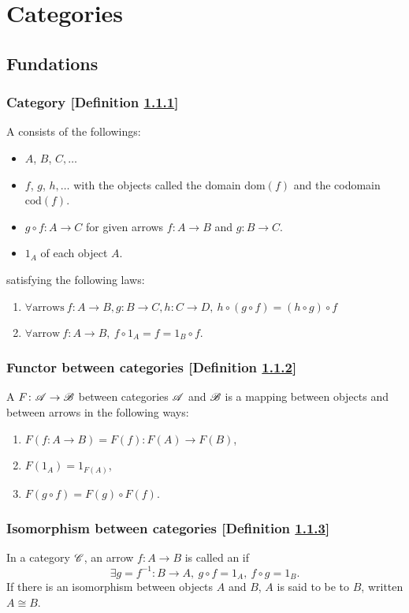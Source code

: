 \newcommand{\sets}{\mathbf{Sets}}
\section{Categories\cite{awodey}}
\subsection{Fundations}
\subsubsection{Category [Definition \ref{category}]}\label{category}
A  consists of the followings:
\begin{itemize}
\item {} $A$, $B$, $C, \dotsc$
\item {} $f$, $g$, $h, \dotsc$ with the objects called the domain $\mathrm{dom}(f)$ and the codomain $\mathrm{cod}(f)$.
\item {} $g \circ f \colon A \to C$ for given arrows $f \colon A \to B$ and $g \colon B \to C$.
\item {} $1_A$ of each object $A$.
\end{itemize}
satisfying the following laws:
\begin{enumerate}
\item $\forall \text{arrows}\ f \colon A \to B, g \colon B \to C, h \colon C \to D,\ h \circ (g \circ f) = (h \circ g) \circ f$
\item $\forall \text{arrow}\ f \colon A \to B,\ f \circ 1_A = f = 1_B \circ f$.
\end{enumerate}

\subsubsection{Functor between categories [Definition \ref{functor-between-categories}]}\label{functor-between-categories}
A  $F\colon \mathscr{A} \to \mathscr{B}$ between categories $\mathscr{A}$ and $\mathscr{B}$ is a mapping between objects and between arrows in the following ways:
\begin{enumerate}
\item $F(f\colon A \to B) = F(f) \colon F(A) \to F(B)$,
\item $F(1_A) = 1_{F(A)}$,
\item $F(g \circ f) = F(g) \circ F(f)$.    
\end{enumerate}

\subsubsection{Isomorphism between categories [Definition \ref{isomorphism-between-categories}]}\label{isomorphism-between-categories}
In a category $\mathscr{C}$, an arrow $f \colon A \to B$ is called an  if
\[
\exists g = f^{-1} \colon B \to A,\ g \circ f = 1_A,\ f \circ g = 1_B.
\]
If there is an isomorphism between objects $A$ and $B$, $A$ is said to be  to $B$, written $A \cong B$.